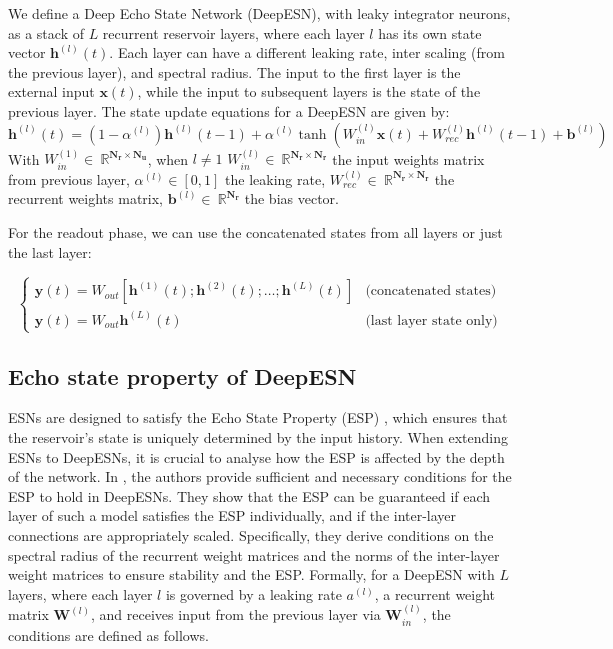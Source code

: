 We define a Deep Echo State Network (DeepESN), with leaky integrator neurons, as a stack of $L$ recurrent reservoir layers, where each layer $l$ has its own state vector $\mathbf{h}^{(l)}(t)$.
Each layer can have a different leaking rate, inter scaling (from the previous layer), and spectral radius.
The input to the first layer is the external input $\mathbf{x}(t)$, while the input to subsequent layers is the state of the previous layer.
\newline
The state update equations for a DeepESN are given by:
\begin{equation}
    \mathbf{h}^{(l)}(t) = (1 - \alpha^{(l)}) \mathbf{h}^{(l)}(t-1) + \alpha^{(l)} \tanh(W_{in}^{(l)} \mathbf{x}(t) + W_{rec}^{(l)} \mathbf{h}^{(l)}(t-1) + \mathbf{b}^{(l)})
\end{equation}
With $W_{in}^{(1)} \in\ \mathbb{R}^\mathbf{N_r \times N_u}$, when $l\neq1$ $W_{in}^{(l)} \in\ \mathbb{R}^\mathbf{N_r \times N_r}$ 
the input weights matrix from previous layer, $\alpha^{(l)} \in [0,1]$ the leaking rate,
 $W_{rec}^{(l)} \in\ \mathbb{R}^\mathbf{N_r \times N_r}$ the recurrent weights matrix, $\mathbf{b}^{(l)} \in\ \mathbb{R}^\mathbf{N_r}$ the bias vector.
 
For the readout phase, we can use the concatenated states from all layers or just the last layer:


\begin{equation}
\begin{cases}
    \mathbf{y}(t) = W_{out} [\mathbf{h}^{(1)}(t); \mathbf{h}^{(2)}(t); \ldots; \mathbf{h}^{(L)}(t)] & \text{(concatenated states)} \\
    \mathbf{y}(t) = W_{out} \mathbf{h}^{(L)}(t) & \text{(last layer state only)}
\end{cases}
\end{equation}


\subsection{Echo state property of DeepESN}
\label{sec:deepesn_esp}
ESNs are designed to satisfy the Echo State Property (ESP) \cite{jaeger2001echo}, which ensures that the reservoir's state is uniquely determined by the input history.
When extending ESNs to DeepESNs, it is crucial to analyse how the ESP is affected by the depth of the network.
In \cite{gallicchio2017echo}, the authors provide sufficient and necessary conditions for the ESP to hold in DeepESNs.
They show that the ESP can be guaranteed if each layer of such a model satisfies the ESP individually, and if the inter-layer connections are appropriately scaled.
Specifically, they derive conditions on the spectral radius of the recurrent weight matrices and the norms of the inter-layer weight matrices to ensure stability and the ESP.
\newline
Formally, for a DeepESN with $L$ layers, where each layer $l$ is governed by a leaking rate $a^{(l)}$, a recurrent weight matrix $\mathbf{W}^{(l)}$, and receives input from the previous layer via $\mathbf{W}_{in}^{(l)}$, the conditions are defined as follows.


